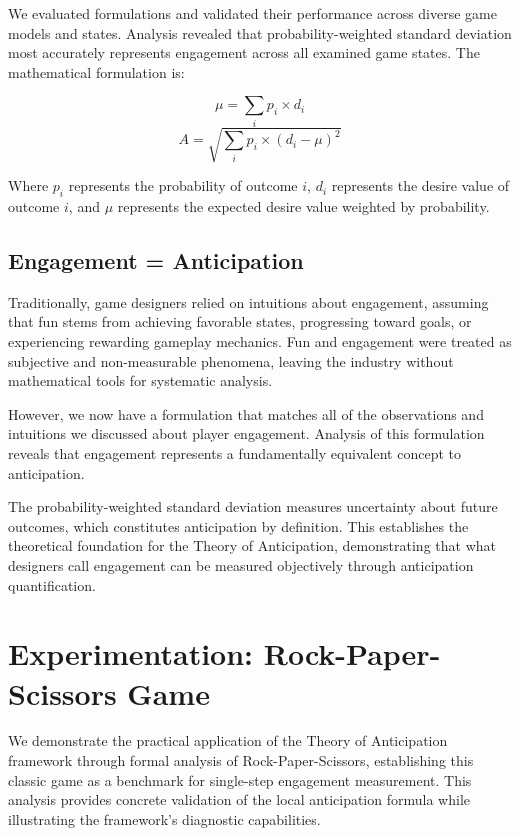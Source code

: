 \documentclass{article}
\begin{document}
We evaluated formulations and validated their performance across diverse game models and states. Analysis revealed that probability-weighted standard deviation most accurately represents engagement across all examined game states. The mathematical formulation is:

\begin{equation}
\mu = \sum_{i} p_i \times d_i
\end{equation}
\begin{equation}
A = \sqrt{\sum_{i} p_i \times (d_i - \mu)^2}
\end{equation}

Where $p_i$ represents the probability of outcome $i$, $d_i$ represents the desire value of outcome $i$, and $\mu$ represents the expected desire value weighted by probability.

\subsection{Engagement = Anticipation}

Traditionally, game designers relied on intuitions about engagement, assuming that fun stems from achieving favorable states, progressing toward goals, or experiencing rewarding gameplay mechanics. Fun and engagement were treated as subjective and non-measurable phenomena, leaving the industry without mathematical tools for systematic analysis.

However, we now have a formulation that matches all of the observations and intuitions we discussed about player engagement. Analysis of this formulation reveals that engagement represents a fundamentally equivalent concept to anticipation.

The probability-weighted standard deviation measures uncertainty about future outcomes, which constitutes anticipation by definition. This establishes the theoretical foundation for the Theory of Anticipation, demonstrating that what designers call engagement can be measured objectively through anticipation quantification.

\section{Experimentation: Rock-Paper-Scissors Game}

We demonstrate the practical application of the Theory of Anticipation framework through formal analysis of Rock-Paper-Scissors, establishing this classic game as a benchmark for single-step engagement measurement. This analysis provides concrete validation of the local anticipation formula while illustrating the framework's diagnostic capabilities.
\end{document}
